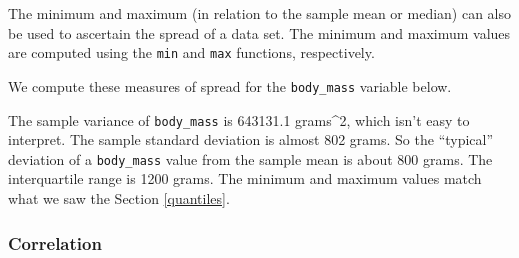 \documentclass[
]{book}
\newenvironment{Shaded}{\begin{snugshade}}{\end{snugshade}}
\newcommand{\AttributeTok}[1]{\textcolor[rgb]{0.77,0.63,0.00}{#1}}
\newcommand{\CommentTok}[1]{\textcolor[rgb]{0.56,0.35,0.01}{\textit{#1}}}
\newcommand{\ConstantTok}[1]{\textcolor[rgb]{0.00,0.00,0.00}{#1}}
\newcommand{\DocumentationTok}[1]{\textcolor[rgb]{0.56,0.35,0.01}{\textbf{\textit{#1}}}}
\newcommand{\FloatTok}[1]{\textcolor[rgb]{0.00,0.00,0.81}{#1}}
\newcommand{\FunctionTok}[1]{\textcolor[rgb]{0.00,0.00,0.00}{#1}}
\newcommand{\NormalTok}[1]{#1}
\newcommand{\SpecialCharTok}[1]{\textcolor[rgb]{0.00,0.00,0.00}{#1}}
\theoremstyle{definition}
\theoremstyle{definition}
\theoremstyle{definition}
\theoremstyle{definition}
\theoremstyle{remark}
\begin{document}
The minimum and maximum (in relation to the sample mean or median) can also be used to ascertain the spread of a data set. The minimum and maximum values are computed using the \texttt{min} and \texttt{max} functions, respectively.

We compute these measures of spread for the \texttt{body\_mass} variable below.

\begin{Shaded}
\end{Shaded}

The sample variance of \texttt{body\_mass} is 643131.1 grams\^{}2, which isn't easy to interpret. The sample standard deviation is almost 802 grams. So the ``typical'' deviation of a \texttt{body\_mass} value from the sample mean is about 800 grams. The interquartile range is 1200 grams. The minimum and maximum values match what we saw the Section \ref{quantiles}.

\hypertarget{correlation}{%
\subsubsection{Correlation}\label{correlation}}
\end{document}

